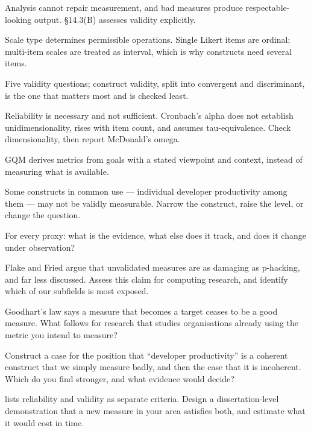 \begin{chaptersummary}
\begin{tight}
  \item Analysis cannot repair measurement, and bad measures produce
    respectable-looking output. \S14.3(B) assesses validity explicitly.
  \item Scale type determines permissible operations. Single Likert items are
    ordinal; multi-item scales are treated as interval, which is why constructs
    need several items.
  \item Five validity questions; construct validity, split into convergent and
    discriminant, is the one that matters most and is checked least.
  \item Reliability is necessary and not sufficient. Cronbach's alpha does not
    establish unidimensionality, rises with item count, and assumes
    tau-equivalence. Check dimensionality, then report McDonald's omega.
  \item GQM derives metrics from goals with a stated viewpoint and context,
    instead of measuring what is available.
  \item Some constructs in common use --- individual developer productivity
    among them --- may not be validly measurable. Narrow the construct, raise
    the level, or change the question.
  \item For every proxy: what is the evidence, what else does it track, and
    does it change under observation?
\end{tight}
\end{chaptersummary}

\begin{reviewq}
  \item Flake and Fried argue that unvalidated measures are as damaging as
    p-hacking, and far less discussed. Assess this claim for computing
    research, and identify which of our subfields is most exposed.
  \item Goodhart's law says a measure that becomes a target ceases to be a good
    measure. What follows for research that studies organisations already using
    the metric you intend to measure?
  \item Construct a case for the position that ``developer productivity'' is a
    coherent construct that we simply measure badly, and then the case that it
    is incoherent. Which do you find stronger, and what evidence would decide?
  \item {} lists reliability and validity as
    separate criteria. Design a dissertation-level demonstration that a new
    measure in your area satisfies both, and estimate what it would cost in
    time.
\end{reviewq}
